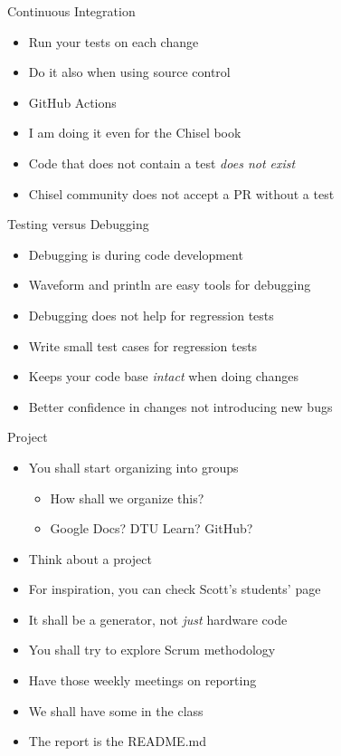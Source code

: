 \begin{frame}[fragile]{Continuous Integration}
\begin{itemize}
\item Run your tests on each change
\item Do it also when using source control
\item GitHub Actions
\item I am doing it even for the Chisel book
\item Code that does not contain a test \emph{does not exist}
\item Chisel community does not accept a PR without a test
\end{itemize}
\end{frame}

\begin{frame}[fragile]{Testing versus Debugging}
\begin{itemize}
\item Debugging is during code development
\item Waveform and println are easy tools for debugging
\item Debugging does not help for regression tests
\item Write small test cases for regression tests
\item Keeps your code base \emph{intact} when doing changes
\item Better confidence in changes not introducing new bugs
\end{itemize}
\end{frame}


\begin{frame}[fragile]{Project}
\begin{itemize}
\item You shall start organizing into groups
\begin{itemize}
\item How shall we organize this?
\item Google Docs? DTU Learn? GitHub?
\end{itemize}
\item Think about a project
\item For inspiration, you can check Scott's students' page
\item It shall be a generator, not \emph{just} hardware code
\item You shall try to explore Scrum methodology
\item Have those weekly meetings on reporting
\item We shall have some in the class
\item The report is the README.md
\end{itemize}
\end{frame}

